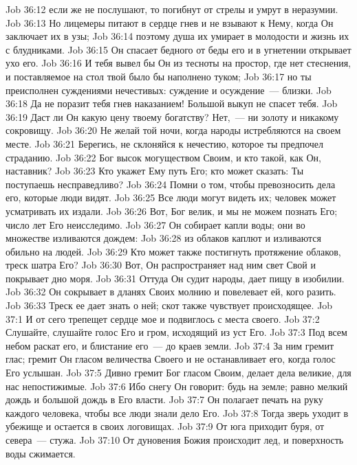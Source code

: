 \vs Job 36:12 если же не послушают, то погибнут от стрелы и умрут в неразумии.
\vs Job 36:13 Но лицемеры питают в сердце гнев и не взывают к Нему, когда Он заключает их в узы;
\vs Job 36:14 поэтому душа их умирает в молодости и жизнь их с блудниками.
\vs Job 36:15 Он спасает бедного от беды его и в угнетении открывает ухо его.
\vs Job 36:16 И тебя вывел бы Он из тесноты на простор, где нет стеснения, и поставляемое на стол твой было бы наполнено туком;
\vs Job 36:17 но ты преисполнен суждениями нечестивых: суждение и осуждение~--- близки.
\vs Job 36:18 Да не поразит тебя гнев  наказанием! Большой выкуп не спасет тебя.
\vs Job 36:19 Даст ли Он какую цену твоему богатству? Нет,~--- ни золоту и никакому сокровищу.
\vs Job 36:20 Не желай той ночи, когда народы истребляются на своем месте.
\vs Job 36:21 Берегись, не склоняйся к нечестию, которое ты предпочел страданию.
\vs Job 36:22 Бог высок могуществом Своим, и кто такой, как Он, наставник?
\vs Job 36:23 Кто укажет Ему путь Его; кто может сказать: Ты поступаешь несправедливо?
\vs Job 36:24 Помни о том, чтобы превозносить дела его, которые люди видят.
\vs Job 36:25 Все люди могут видеть их; человек может усматривать их издали.
\vs Job 36:26 Вот, Бог велик, и мы не можем познать Его; число лет Его неисследимо.
\vs Job 36:27 Он собирает капли воды; они во множестве изливаются дождем:
\vs Job 36:28 из облаков каплют и изливаются обильно на людей.
\vs Job 36:29 Кто может также постигнуть протяжение облаков, треск шатра Его?
\vs Job 36:30 Вот, Он распространяет над ним свет Свой и покрывает дно моря.
\vs Job 36:31 Оттуда Он судит народы, дает пищу в изобилии.
\vs Job 36:32 Он сокрывает в дланях Своих молнию и повелевает ей, кого разить.
\vs Job 36:33 Треск ее дает знать о ней; скот также чувствует происходящее.
\vs Job 37:1 И от сего трепещет сердце мое и подвиглось с места своего.
\vs Job 37:2 Слушайте, слушайте голос Его и гром, исходящий из уст Его.
\vs Job 37:3 Под всем небом раскат его, и блистание его~--- до краев земли.
\vs Job 37:4 За ним гремит глас; гремит Он гласом величества Своего и не останавливает его, когда голос Его услышан.
\vs Job 37:5 Дивно гремит Бог гласом Своим, делает дела великие, для нас непостижимые.
\vs Job 37:6 Ибо снегу Он говорит: будь на земле; равно мелкий дождь и большой дождь в Его власти.
\vs Job 37:7 Он полагает печать на руку каждого человека, чтобы все люди знали дело Его.
\vs Job 37:8 Тогда зверь уходит в убежище и остается в своих логовищах.
\vs Job 37:9 От юга приходит буря, от севера~--- стужа.
\vs Job 37:10 От дуновения Божия происходит лед, и поверхность воды сжимается.
